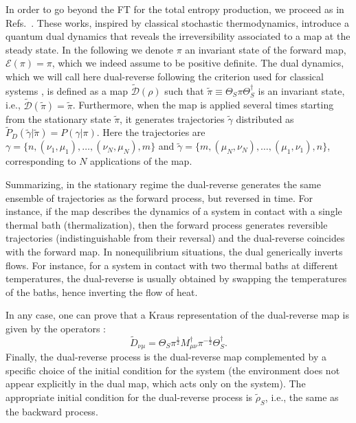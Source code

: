 \documentclass[aps,prx,twocolumn,showpacs,floatfix,superscriptaddress,graphics,longbibliography]{revtex4-1}
\newcommand{\E}{{\mathcal E}}
\newcommand{\D}{{\mathcal D}}
\newcommand{\HAT}{}
\begin{document}
In order to go beyond the FT for the total entropy production, we proceed as in Refs.~\cite{Crooks,MHP}. 
These works, inspired by classical stochastic thermodynamics, introduce a quantum dual dynamics that reveals the irreversibility associated to a map at the steady state.
In the following we denote $\pi$ an invariant state of the forward map, $\E(\pi)=\pi$, which we indeed assume to be positive definite. 
The dual dynamics, which we will call here dual-reverse following the criterion used for classical systems \cite{EspositoFaces,EspositoFacesI,EspositoFacesII}, is defined as a map $\tilde{\mathcal D}(\rho)$ such that $\tilde\pi\equiv \Theta_S \pi\Theta^\dagger_S$ is an  invariant state, i.e., $\tilde\D(\tilde\pi)=\tilde\pi$. 
Furthermore, when the map is applied several times starting from the stationary state $\tilde\pi$, it generates trajectories $\tilde\gamma$ distributed as $\tilde P_{D}(\tilde\gamma|\tilde\pi)=P(\gamma|\pi)$. 
Here the trajectories are  $\gamma=\{n,(\nu_1,\mu_1),\dots,(\nu_N,\mu_N),m\}$ and $\tilde\gamma=\{m,(\mu_N,\nu_N),\dots,(\mu_1,\nu_1),n\}$, corresponding to $N$ applications of the map. 

Summarizing, in the stationary regime the dual-reverse generates the same ensemble of trajectories as the forward process, but reversed in time.
For instance, if the map describes the dynamics of a system in contact with a single thermal bath (thermalization), then the forward process generates reversible trajectories (indistinguishable from their reversal) and the dual-reverse coincides with the forward map. 
In nonequilibrium situations, the dual generically inverts flows. For instance, for a system in contact with two thermal baths at different temperatures, the dual-reverse is usually obtained by swapping the temperatures of the baths, hence inverting the flow of heat.

In any case, one can prove that a Kraus representation of the dual-reverse map is given by the operators \cite{Crooks,MHP}:
 \begin{equation}
\label{dualr_k}
 \HAT{\tilde{D}}_{\nu \mu}= \HAT\Theta_S \pi^{ \frac{1}{2}} \HAT{M}_{\mu \nu}^\dagger \pi^{-\frac{1}{2}}\HAT\Theta_S^\dagger.
\end{equation}
Finally, the dual-reverse process is the dual-reverse map complemented by a specific choice of the initial condition for the system (the environment does not appear explicitly in the dual map, which acts only on the system). 
The appropriate initial  condition for the dual-reverse process is $\tilde\rho_S$, i.e., the same as the backward process.
\end{document}
